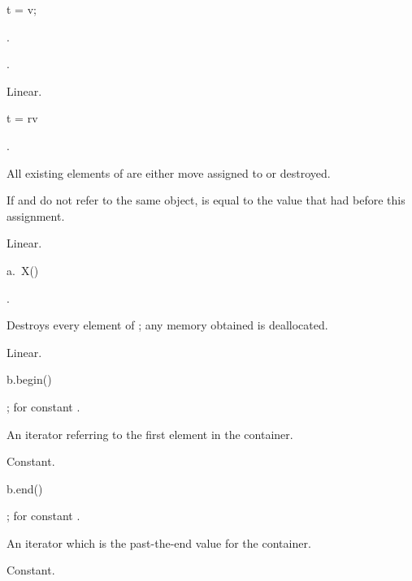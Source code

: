 %
\begin{itemdecl}
t = v;
\end{itemdecl}

\begin{itemdescr}
\pnum
\result
{}.

\pnum
\ensures
{}.

\pnum
\complexity
Linear.
\end{itemdescr}

\begin{itemdecl}
t = rv
\end{itemdecl}

\begin{itemdescr}
\pnum
\result
{}.

\pnum
\effects
All existing elements of  are either move assigned to or destroyed.

\pnum
\ensures
If  and  do not refer to the same object,
 is equal to the value that  had before this assignment.

\pnum
\complexity
Linear.
\end{itemdescr}

\begin{itemdecl}
a.~X()
\end{itemdecl}

\begin{itemdescr}
\pnum
\result
{}.

\pnum
\effects
Destroys every element of ; any memory obtained is deallocated.

\pnum
\complexity
Linear.
\end{itemdescr}

%
\begin{itemdecl}
b.begin()
\end{itemdecl}

\begin{itemdescr}
\pnum
\result
{};
 for constant .

\pnum
\returns
An iterator referring to the first element in the container.

\pnum
\complexity
Constant.
\end{itemdescr}

%
\begin{itemdecl}
b.end()
\end{itemdecl}

\begin{itemdescr}
\pnum
\result
{};
 for constant .

\pnum
\returns
An iterator which is the past-the-end value for the container.

\pnum
\complexity
Constant.
\end{itemdescr}

